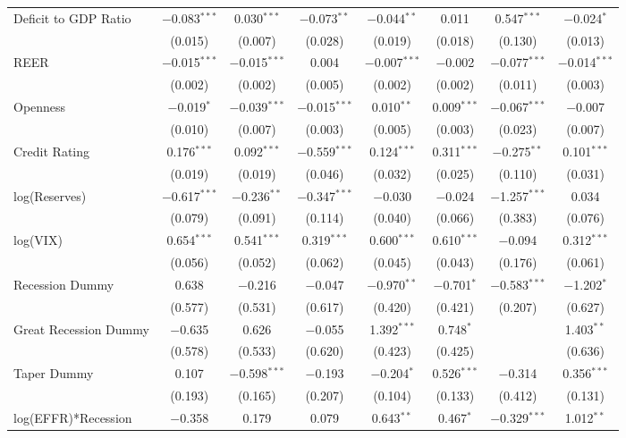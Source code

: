 \documentclass[12pt]{article}
\begin{document}
\begin{landscape}
\begin{table}[!htbp]
\begin{tabular}{@{\extracolsep{5pt}}lccccccc}
  Deficit to GDP Ratio & $-$0.083$^{***}$ & 0.030$^{***}$ & $-$0.073$^{**}$ & $-$0.044$^{**}$ & 0.011 & 0.547$^{***}$ & $-$0.024$^{*}$ \\ 
  & (0.015) & (0.007) & (0.028) & (0.019) & (0.018) & (0.130) & (0.013) \\ 
  REER & $-$0.015$^{***}$ & $-$0.015$^{***}$ & 0.004 & $-$0.007$^{***}$ & $-$0.002 & $-$0.077$^{***}$ & $-$0.014$^{***}$ \\ 
  & (0.002) & (0.002) & (0.005) & (0.002) & (0.002) & (0.011) & (0.003) \\ 
  Openness & $-$0.019$^{*}$ & $-$0.039$^{***}$ & $-$0.015$^{***}$ & 0.010$^{**}$ & 0.009$^{***}$ & $-$0.067$^{***}$ & $-$0.007 \\ 
  & (0.010) & (0.007) & (0.003) & (0.005) & (0.003) & (0.023) & (0.007) \\ 
  Credit Rating & 0.176$^{***}$ & 0.092$^{***}$ & $-$0.559$^{***}$ & 0.124$^{***}$ & 0.311$^{***}$ & $-$0.275$^{**}$ & 0.101$^{***}$ \\ 
  & (0.019) & (0.019) & (0.046) & (0.032) & (0.025) & (0.110) & (0.031) \\ 
  log(Reserves) & $-$0.617$^{***}$ & $-$0.236$^{**}$ & $-$0.347$^{***}$ & $-$0.030 & $-$0.024 & $-$1.257$^{***}$ & 0.034 \\ 
  & (0.079) & (0.091) & (0.114) & (0.040) & (0.066) & (0.383) & (0.076) \\ 
  log(VIX) & 0.654$^{***}$ & 0.541$^{***}$ & 0.319$^{***}$ & 0.600$^{***}$ & 0.610$^{***}$ & $-$0.094 & 0.312$^{***}$ \\ 
  & (0.056) & (0.052) & (0.062) & (0.045) & (0.043) & (0.176) & (0.061) \\ 
  Recession Dummy & 0.638 & $-$0.216 & $-$0.047 & $-$0.970$^{**}$ & $-$0.701$^{*}$ & $-$0.583$^{***}$ & $-$1.202$^{*}$ \\ 
  & (0.577) & (0.531) & (0.617) & (0.420) & (0.421) & (0.207) & (0.627) \\ 
  Great Recession Dummy & $-$0.635 & 0.626 & $-$0.055 & 1.392$^{***}$ & 0.748$^{*}$ &  & 1.403$^{**}$ \\ 
  & (0.578) & (0.533) & (0.620) & (0.423) & (0.425) &  & (0.636) \\ 
  Taper Dummy & 0.107 & $-$0.598$^{***}$ & $-$0.193 & $-$0.204$^{*}$ & 0.526$^{***}$ & $-$0.314 & 0.356$^{***}$ \\ 
  & (0.193) & (0.165) & (0.207) & (0.104) & (0.133) & (0.412) & (0.131) \\ 
  log(EFFR)*Recession & $-$0.358 & 0.179 & 0.079 & 0.643$^{**}$ & 0.467$^{*}$ & $-$0.329$^{***}$ & 1.012$^{**}$ \\ 

\end{tabular}
\end{table}
\end{landscape}
\end{document}
